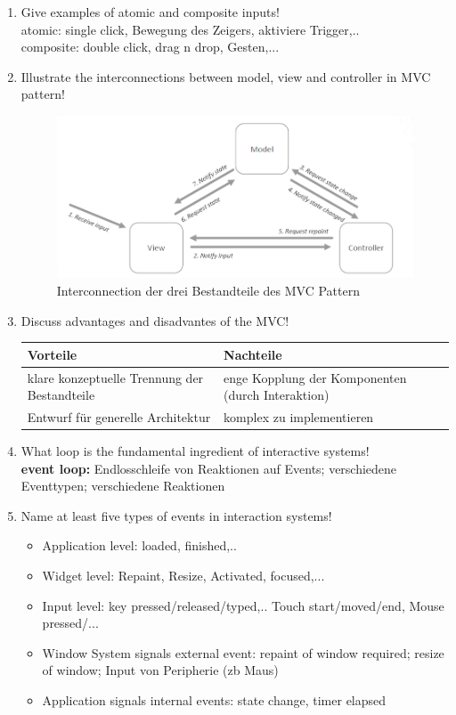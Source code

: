 \begin{enumerate}
	\item Give examples of atomic and composite inputs!\\
	atomic: single click, Bewegung des Zeigers, aktiviere Trigger,..\\
	composite: double click, drag n drop, Gesten,...
	
	\item Illustrate the interconnections between model, view and controller in MVC pattern!
	\begin{figure}[!h]
		\centering
		\includegraphics[scale=0.5]{img/mvc_interconnection.png}
		\caption{Interconnection der drei Bestandteile des MVC Pattern}
	\end{figure}
	
	\item Discuss advantages and disadvantes of the MVC!
	\begin{table}[!h]
		\centering
		\begin{tabular}{|p{20em}|p{20em}|}
			\hline
			\textbf{Vorteile} & \textbf{Nachteile}\\
			\hline
			klare konzeptuelle Trennung der Bestandteile & \tabitem enge Kopplung der Komponenten (durch Interaktion)\\
			\tabitem Entwurf für generelle Architektur & \tabitem komplex zu implementieren\\
			\hline
		\end{tabular}
	\end{table}
	
	\item What loop is the fundamental ingredient of interactive systems!\\
	\textbf{event loop:} Endlosschleife von Reaktionen auf Events; verschiedene Eventtypen; verschiedene Reaktionen
	
	\item Name at least five types of events in interaction systems!
	\begin{itemize}
		\item Application level: loaded, finished,..
		\item Widget level: Repaint, Resize, Activated, focused,...
		\item Input level: key pressed/released/typed,.. Touch start/moved/end, Mouse pressed/...
		\item Window System signals external event: repaint of window required; resize of window; Input von Peripherie (zb Maus)
		\item Application signals internal events: state change, timer elapsed
	\end{itemize}
	

\end{enumerate}
